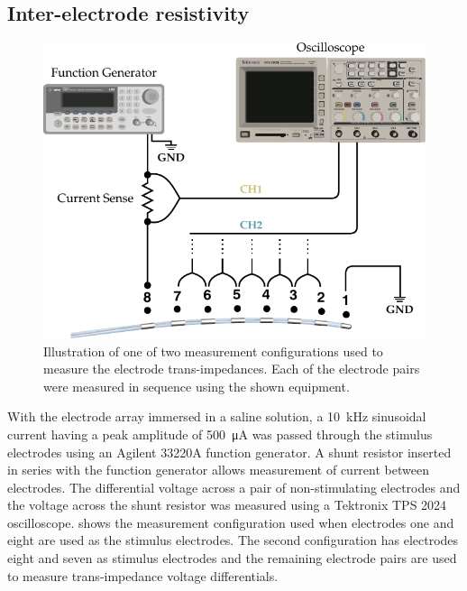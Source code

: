 

    \subsection{Inter-electrode resistivity}


      \begin{figure}
        \centering
        \includegraphics{content/pt2/08-InterfaceParameters/graphics/measurement_resistorMesh}
        \caption{\label{fig:pt2-measurement_resistorMesh}Illustration of one of two measurement configurations used to measure the electrode trans-impedances. Each of the electrode pairs were measured in sequence using the shown equipment.}
      \end{figure}

      With the electrode array immersed in a saline solution, a \SI{10}{\kilo\hertz} sinusoidal current having a peak amplitude of \SI{500}{\micro\ampere} was passed through the stimulus electrodes using an Agilent 33220A function generator.
      A shunt resistor inserted in series with the function generator allows measurement of current between electrodes.
      The differential voltage across a pair of non-stimulating electrodes and the voltage across the shunt resistor was measured using a Tektronix TPS 2024 oscilloscope.
       shows the measurement configuration used when electrodes one and eight are used as the stimulus electrodes.
      The second configuration has electrodes eight and seven as stimulus electrodes and the remaining electrode pairs are used to measure trans-impedance voltage differentials.

